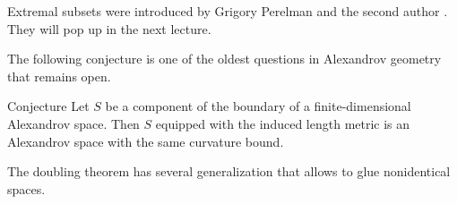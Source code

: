 Extremal subsets were introduced by Grigory Perelman and the second author \cite{perelman-petrunin}.
They will pop up in the next lecture.

The following conjecture is one of the oldest questions in Alexandrov geometry that remains open.

\begin{thm}{Conjecture}
Let $S$ be a component of the boundary of a finite-dimensional Alexandrov space.
Then $S$ equipped with the induced length metric is an Alexandrov space with the same curvature bound.
\end{thm}

The doubling theorem has several generalization \cite{petrunin1997,ge-li} that allows to glue nonidentical spaces.
